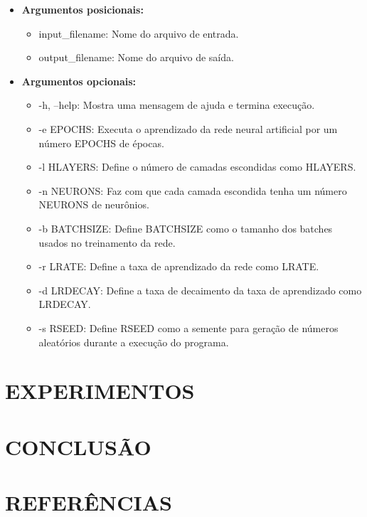 \documentclass[12pt]{article}
\begin{document}
\begin{itemize}
	\item \textbf{Argumentos posicionais:}

	\begin{itemize}
		\item input\_filename: Nome do arquivo de entrada.
	 	\item output\_filename: Nome do arquivo de saída.
	\end{itemize}

	\item \textbf{Argumentos opcionais:}

	\begin{itemize}
		\item -h, --help: Mostra uma mensagem de ajuda e termina
		execução.
		\item -e EPOCHS: Executa o aprendizado da rede neural artificial
		por um número EPOCHS de épocas.
		\item -l HLAYERS: Define o número de camadas escondidas como 
		HLAYERS.
		\item -n NEURONS: Faz com que cada camada escondida tenha
		um número NEURONS de neurônios.
		\item -b BATCHSIZE: Define BATCHSIZE como o tamanho dos
		batches usados no treinamento da rede.
		\item -r LRATE: Define a taxa de aprendizado da rede como LRATE.
		\item -d LRDECAY: Define a taxa de decaimento da taxa de
		aprendizado como LRDECAY.
		\item -s RSEED: Define RSEED como a semente para geração de 
		números aleatórios durante a execução do programa.
	\end{itemize}
\end{itemize}

\section{EXPERIMENTOS} \label{sec:exp}



\section{CONCLUSÃO}



\section{REFERÊNCIAS}



\end{document}
